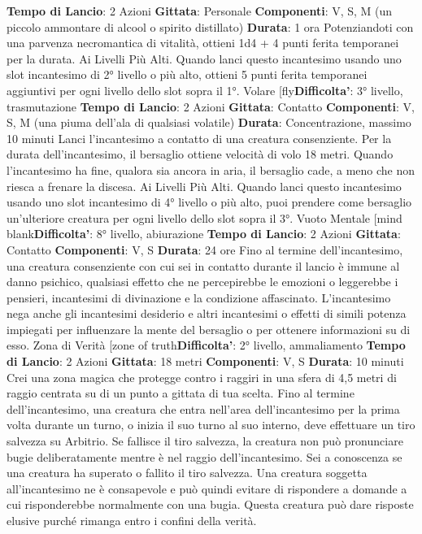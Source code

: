 \begin{multicols}{2}
\textbf{Tempo di Lancio}: 2 Azioni
\textbf{Gittata}: Personale
\textbf{Componenti}: V, S, M (un piccolo ammontare di alcool
o spirito distillato)
\textbf{Durata}: 1 ora
Potenziandoti con una parvenza necromantica di
vitalità, ottieni 1d4 + 4 punti ferita temporanei per la
durata.
Ai Livelli Più Alti. Quando lanci questo incantesimo
usando uno slot incantesimo di 2° livello o più alto,
ottieni 5 punti ferita temporanei aggiuntivi per ogni
livello dello slot sopra il 1°.
Volare
[fly\textbf{Difficolta'}:
3° livello, trasmutazione
\textbf{Tempo di Lancio}: 2 Azioni
\textbf{Gittata}: Contatto
\textbf{Componenti}: V, S, M (una piuma dell’ala di qualsiasi
volatile)
\textbf{Durata}: Concentrazione, massimo 10 minuti
Lanci l’incantesimo a contatto di una creatura
consenziente. Per la durata dell’incantesimo, il
bersaglio ottiene velocità di volo 18 metri. Quando
l’incantesimo ha fine, qualora sia ancora in aria, il
bersaglio cade, a meno che non riesca a frenare la
discesa.
Ai Livelli Più Alti. Quando lanci questo incantesimo
usando uno slot incantesimo di 4° livello o più alto, puoi
prendere come bersaglio un’ulteriore creatura per ogni
livello dello slot sopra il 3°.
Vuoto Mentale
[mind blank\textbf{Difficolta'}:
8° livello, abiurazione
\textbf{Tempo di Lancio}: 2 Azioni
\textbf{Gittata}: Contatto
\textbf{Componenti}: V, S
\textbf{Durata}: 24 ore
Fino al termine dell’incantesimo, una creatura
consenziente con cui sei in contatto durante il lancio è
immune al danno psichico, qualsiasi effetto che ne
percepirebbe le emozioni o leggerebbe i pensieri,
incantesimi di divinazione e la condizione affascinato.
L’incantesimo nega anche gli incantesimi desiderio e
altri incantesimi o effetti di simili potenza impiegati per
influenzare la mente del bersaglio o per ottenere
informazioni su di esso.
Zona di Verità
[zone of truth\textbf{Difficolta'}:
2° livello, ammaliamento
\textbf{Tempo di Lancio}: 2 Azioni
\textbf{Gittata}: 18 metri
\textbf{Componenti}: V, S
\textbf{Durata}: 10 minuti
Crei una zona magica che protegge contro i raggiri in
una sfera di 4,5 metri di raggio centrata su di un punto a
gittata di tua scelta. Fino al termine dell’incantesimo,
una creatura che entra nell’area dell’incantesimo per la
prima volta durante un turno, o inizia il suo turno al suo
interno, deve effettuare un tiro salvezza su Arbitrio. Se
fallisce il tiro salvezza, la creatura non può pronunciare
bugie deliberatamente mentre è nel raggio
dell’incantesimo. Sei a conoscenza se una creatura ha
superato o fallito il tiro salvezza.
Una creatura soggetta all’incantesimo ne è
consapevole e può quindi evitare di rispondere a
domande a cui risponderebbe normalmente con una
bugia. Questa creatura può dare risposte elusive
purché rimanga entro i confini della verità.

\end{multicols}